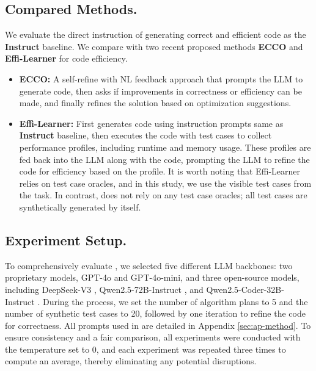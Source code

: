 \subsection{Compared Methods.}
We evaluate the direct instruction of generating correct and efficient code as the \textbf{Instruct} baseline. We compare \tool with two recent proposed methods \textbf{ECCO} \cite{waghjale-etal-2024-ecco} and \textbf{Effi-Learner} \cite{EffiLearner} for code efficiency. 
\begin{itemize}[leftmargin=*,itemsep=2pt,topsep=0pt,parsep=0pt]
\item \textbf{ECCO:} A self-refine with NL feedback approach that prompts the LLM to generate code, then asks if improvements in correctness or efficiency can be made, and finally refines the solution based on optimization suggestions.
\item \textbf{Effi-Learner:} First generates code using instruction prompts same as \textbf{Instruct} baseline, then executes the code with test cases to collect performance profiles, including runtime and memory usage. These profiles are fed back into the LLM along with the code, prompting the LLM to refine the code for efficiency based on the profile. It is worth noting that Effi-Learner relies on test case oracles, and in this study, we use the visible test cases from the task. In contrast, \tool does not rely on any test case oracles; all test cases are synthetically generated by \tool itself.
\end{itemize}

\subsection{Experiment Setup.}
To comprehensively evaluate \tool, we selected five different LLM backbones: two proprietary models, GPT-4o \cite{openai2024gpt4ocard} and GPT-4o-mini, and three open-source models, including DeepSeek-V3  \cite{deepseekai2024deepseekv3technicalreport}, Qwen2.5-72B-Instruct \cite{qwen2.5}, and Qwen2.5-Coder-32B-Instruct \cite{hui2024qwen2}. During the \tool process, we set the number of algorithm plans to 5 and the number of synthetic test cases to 20, followed by one iteration to refine the code for correctness. All prompts used in \tool are detailed in Appendix \ref{sec:ap-method}. To ensure consistency and a fair comparison, all experiments were conducted with the temperature set to 0, and each experiment was repeated three times to compute an average, thereby eliminating any potential disruptions.

